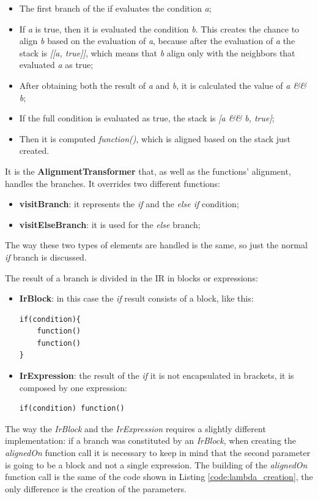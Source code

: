 \begin{itemize}
    \item The first branch of the if evaluates the condition \textit{a};
    \item If \textit{a} is true, then it is evaluated the condition \textit{b}. This creates the chance to align \textit{b} based on the evaluation of \textit{a}, because after the evaluation of \textit{a} the stack is \textit{[[a, true]]}, which means that \textit{b} align only with the neighbors that evaluated \textit{a} as true;
    \item After obtaining both the result of \textit{a} and \textit{b}, it is calculated the value of \textit{a \&\& b};
    \item If the full condition is evaluated as true, the stack is \textit{[a \&\& b, true]};
    \item Then it is computed \textit{function()}, which is aligned based on the stack just created.
\end{itemize}

It is the \textbf{AlignmentTransformer} that, as well as the functions' alignment, handles the branches. It overrides two different functions:
\begin{itemize}
    \item \textbf{visitBranch}: it represents the \textit{if} and the \textit{else if} condition;
    \item \textbf{visitElseBranch}: it is used for the \textit{else} branch;
\end{itemize}
The way these two types of elements are handled is the same, so just the normal \textit{if} branch is discussed.

The result of a branch is divided in the IR in blocks or expressions:
\begin{itemize}
    \item \textbf{IrBlock}: in this case the \textit{if} result consists of a block, like this:
\begin{lstlisting}
if(condition){
    function()
    function()
}
\end{lstlisting} 
    \item \textbf{IrExpression}: the result of the \textit{if} it is not encapsulated in brackets, it is composed by one expression:
\begin{lstlisting}
if(condition) function()
\end{lstlisting}
\end{itemize}

The way the \textit{IrBlock} and the \textit{IrExpression} requires a slightly different implementation: if a branch was constituted by an \textit{IrBlock}, when creating the \textit{alignedOn} function call it is necessary to keep in mind that the second parameter is going to be a block and not a single expression.\newline
The building of the \textit{alignedOn} function call is the same of the code shown in Listing \ref{code:lambda_creation}, the only difference is the creation of the parameters. 

